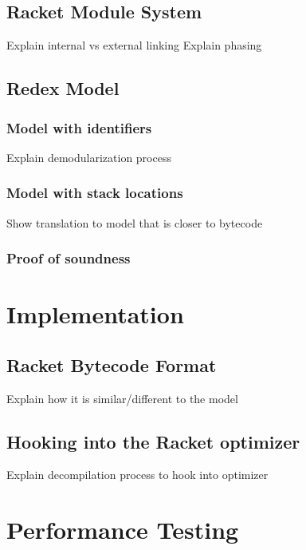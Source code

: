 \documentclass{llncs}
\begin{document}
  \subsection{Racket Module System}

  Explain internal vs external linking
  Explain phasing
  \subsection{Redex Model}
    \subsubsection{Model with identifiers}

    Explain demodularization process
    
    \subsubsection{Model with stack locations}

    Show translation to model that is closer to bytecode
    
    \subsubsection{Proof of soundness}
\section{Implementation}
   \subsection{Racket Bytecode Format}

   Explain how it is similar/different to the model
   
   \subsection{Hooking into the Racket optimizer}

   Explain decompilation process to hook into optimizer

\section{Performance Testing}
  
\end{document}
